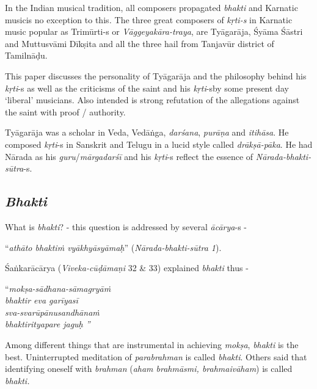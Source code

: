 In the Indian musical tradition, all composers propagated \textit{bhakti} and Karnatic musicis no exception to this\textit{. }The three great composers of \textit{kṛti-s} in Karnatic music popular as Trimūrti-s or \textit{Vāggeyakāra-traya}, are Tyāgarāja, Śyāma Śāstri and Muttusvāmi Dīkṣita and all the three hail from Tanjavūr district of Tamilnāḍu. 

This paper discusses the personality of Tyāgarāja and the philosophy behind his \textit{kṛti}-s as well as the criticisms of the saint and his \textit{kṛti}-s\break by some present day ‘liberal’ musicians. Also intended is strong refutation of the allegations against the saint with proof / authority.

Tyāgarāja was a scholar in Veda, Vedāṅga, \textit{darśana}, \textit{purāṇa} and \textit{itihāsa}. He composed \textit{kṛti}-s in Sanskrit and Telugu in a lucid style called \textit{drākṣā-pāka}. He had Nārada as his \textit{guru}/\textit{mārgadarśī} and his \textit{kṛti}-s reflect the essence of \textit{Nārada-bhakti-sūtra}-s.

\subsection*{\textit{Bhakti}}

What is \textit{bhakti}? - this question is addressed by several \textit{ācārya}-s - 

“\textit{athāto bhaktiṁ vyākhyāsyāmaḥ}” (\textit{Nārada-bhakti-sūtra 1}).

Śaṅkarācārya (\textit{Viveka-cūḍāmaṇi} 32 \& 33) explained \textit{bhakti} thus -

\begin{centerquote}
“\textit{mokṣa-sādhana-sāmagryāṁ}\\ \textit{bhaktir eva garīyasī }\\ \textit{sva-svarūpānusandhānaṁ}\\ \textit{bhaktirityapare jaguḥ ”}
\end{centerquote}

\newpage

Among different things that are instrumental in achieving \textit{mokṣa}, \textit{bhakti} is the best. Uninterrupted meditation of \textit{parabrahman} is called \textit{bhakti}. Others said that identifying oneself with \textit{brahman} (\textit{aham brahmāsmi, brahmaivāham}) is called \textit{bhakti.}

